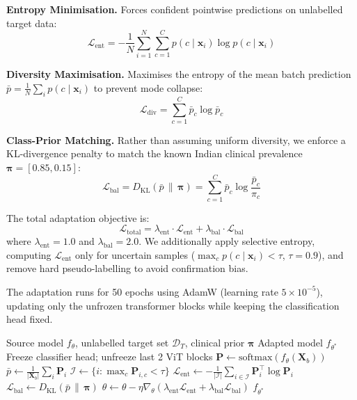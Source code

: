 \documentclass[11pt,twocolumn]{article}
\newcommand{\lent}{\mathcal{L}_{\mathrm{ent}}}
\newcommand{\ldiv}{\mathcal{L}_{\mathrm{div}}}
\newcommand{\lbal}{\mathcal{L}_{\mathrm{bal}}}
\newcommand{\ltotal}{\mathcal{L}_{\mathrm{total}}}
\begin{document}
\textbf{Entropy Minimisation.} Forces confident pointwise predictions on unlabelled target data:
\begin{equation}
    \lent = -\frac{1}{N}\sum_{i=1}^{N} \sum_{c=1}^{C} p(c \mid \mathbf{x}_i) \log p(c \mid \mathbf{x}_i)
    \label{eq:entropy}
\end{equation}

\textbf{Diversity Maximisation.} Maximises the entropy of the mean batch prediction $\bar{p} = \frac{1}{N}\sum_{i} p(c \mid \mathbf{x}_i)$ to prevent mode collapse:
\begin{equation}
    \ldiv = \sum_{c=1}^{C} \bar{p}_c \log \bar{p}_c
    \label{eq:diversity}
\end{equation}

\textbf{Class-Prior Matching.} Rather than assuming uniform diversity, we enforce a KL-divergence penalty to match the known Indian clinical prevalence $\boldsymbol{\pi} = [0.85, 0.15]$:
\begin{equation}
    \lbal = D_{\mathrm{KL}}(\bar{p} \,\|\, \boldsymbol{\pi}) = \sum_{c=1}^{C} \bar{p}_c \log \frac{\bar{p}_c}{\pi_c}
    \label{eq:kl}
\end{equation}

The total adaptation objective is:
\begin{equation}
    \ltotal = \lambda_{\mathrm{ent}} \cdot \lent + \lambda_{\mathrm{bal}} \cdot \lbal
    \label{eq:total}
\end{equation}
where $\lambda_{\mathrm{ent}} = 1.0$ and $\lambda_{\mathrm{bal}} = 2.0$. We additionally apply selective entropy, computing $\lent$ only for uncertain samples ($\max_c p(c \mid \mathbf{x}_i) < \tau$, $\tau = 0.9$), and remove hard pseudo-labelling to avoid confirmation bias.

The adaptation runs for 50 epochs using AdamW (learning rate $5 \times 10^{-5}$), updating only the unfrozen transformer blocks while keeping the classification head fixed.

\begin{algorithm}[t]
\caption{Netra-Adapt: SFDA via Information Maximisation}
\label{alg:netra_adapt}
\begin{algorithmic}[1]
\Require Source model $f_\theta$, unlabelled target set $\mathcal{D}_T$, clinical prior $\boldsymbol{\pi}$
\Ensure Adapted model $f_{\theta^*}$
\State Freeze classifier head; unfreeze last 2 ViT blocks
        \State $\mathbf{P} \leftarrow \mathrm{softmax}(f_\theta(\mathbf{X}_b))$ 
        \State $\bar{p} \leftarrow \frac{1}{|\mathbf{X}_b|}\sum_i \mathbf{P}_i$ 
        \State $\mathcal{I} \leftarrow \{i : \max_c \mathbf{P}_{i,c} < \tau\}$ 
        \State $\lent \leftarrow -\frac{1}{|\mathcal{I}|}\sum_{i \in \mathcal{I}} \mathbf{P}_i^\top \log \mathbf{P}_i$
        \State $\lbal \leftarrow D_{\mathrm{KL}}(\bar{p} \,\|\, \boldsymbol{\pi})$
        \State $\theta \leftarrow \theta - \eta \nabla_\theta (\lambda_{\mathrm{ent}} \lent + \lambda_{\mathrm{bal}} \lbal)$
    \EndFor
\EndFor
\State \Return $f_{\theta^*}$
\end{algorithmic}
\end{algorithm}
\end{document}

